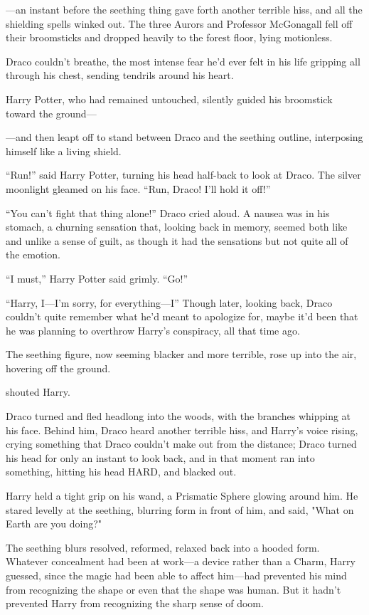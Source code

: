 \begin{em}
---an instant before the seething thing gave forth another terrible hiss,
and all the shielding spells winked out. The three Aurors and Professor
McGonagall fell off their broomsticks and dropped heavily to the forest floor,
lying motionless.

Draco couldn't breathe, the most intense fear he'd ever felt in his life
gripping all through his chest, sending tendrils around his heart.

Harry Potter, who had remained untouched, silently guided his broomstick
toward the ground\mbox{---}

---and then leapt off to stand between Draco and the seething outline,
interposing himself like a living shield.

``Run!'' said Harry Potter, turning his head half-back to look at Draco.
The silver moonlight gleamed on his face. ``Run, Draco! I'll hold it off!''

``You can't fight that thing alone!'' Draco cried aloud. A nausea was in
his stomach, a churning sensation that, looking back in memory, seemed both
like and unlike a sense of guilt, as though it had the sensations but not quite
all of the emotion.

``I must,'' Harry Potter said grimly. ``Go!''

``Harry, I---I'm sorry, for everything---I'' Though later, looking back,
Draco couldn't quite remember what he'd meant to apologize for, maybe it'd been
that he was planning to overthrow Harry's conspiracy, all that time ago.

The seething figure, now seeming blacker and more terrible, rose up into
the air, hovering off the ground.

 shouted Harry.

Draco turned and fled headlong into the woods, with the branches whipping
at his face. Behind him, Draco heard another terrible hiss, and Harry's voice
rising, crying something that Draco couldn't make out from the distance; Draco
turned his head for only an instant to look back, and in that moment ran into
something, hitting his head HARD, and blacked out.
\end{em}
\sbreak
Harry held a tight grip on his wand, a Prismatic Sphere glowing around him. He
stared levelly at the seething, blurring form in front of him, and said, "What
on Earth are you doing?"

The seething blurs resolved, reformed, relaxed back into a hooded form.
Whatever concealment had been at work---a device rather than a Charm, Harry
guessed, since the magic had been able to affect him---had prevented his mind
from recognizing the shape or even that the shape was human. But it hadn't
prevented Harry from recognizing the sharp sense of doom.

